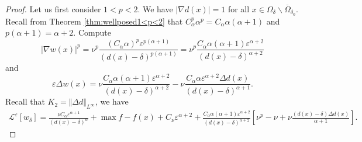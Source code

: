 \documentclass[11pt,reqno]{amsart}
\numberwithin{figure}{section}
\theoremstyle{plain}
\theoremstyle{remark}
\numberwithin{equation}{section}
\begin{document}

\begin{proof} Let us first consider $1<p<2$. We have $|\nabla d(x)| = 1$ for all $x\in \Omega_\delta\backslash \overline{\Omega}_{\delta_0}$. Recall from Theorem \ref{thm:wellposed1<p<2} that $C_\alpha^p \alpha^p = C_\alpha \alpha (\alpha+1)$ and $p(\alpha+1) = \alpha+2$. Compute 
\begin{equation*}
    |\nabla w(x)|^p = \nu^p\frac{(C_\alpha\alpha)^p\varepsilon^{p(\alpha+1)}}{(d(x)-\delta)^{p(\alpha+1)}} = \nu^p\frac{C_\alpha \alpha(\alpha+1)\varepsilon^{\alpha+2}}{(d(x)-\delta)^{\alpha+2}}
\end{equation*}
and
\begin{equation*}
    \varepsilon\Delta w(x) = \nu\frac{C_\alpha\alpha(\alpha+1)\varepsilon^{\alpha+2}}{(d(x)-\delta)^{\alpha+2}} - \nu\frac{C_\alpha\alpha\varepsilon^{\alpha+2}\Delta d(x)}{(d(x)-\delta)^{\alpha+1}}.
\end{equation*}
Recall that $K_2= \Vert \Delta d\Vert_{L^\infty}$, we have
\begin{equation*}
    \begin{split}
        \mathcal{L}^\varepsilon\left[w_\delta\right] =  \frac{\nu C_\alpha\varepsilon^{\alpha+1}}{(d(x)-\delta)^\alpha} + \max f - f(x) + C_\nu \varepsilon^{\alpha+2} + \frac{C_\alpha \alpha (\alpha+1)\varepsilon^{\alpha+2}}{(d(x)-\delta)^{\alpha+2}}\left[\nu^p-\nu +\nu\frac{(d(x)-\delta)\Delta d(x)}{\alpha+1}\right] .
    \end{split}
\end{equation*}

\end{proof}
\end{document}
